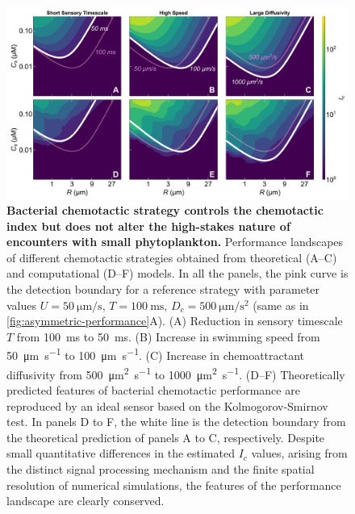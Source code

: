 \documentclass[9pt,twocolumn,twoside]{pnas-new}
\begin{document}
\begin{figure}
    \centering
    \includegraphics[width=17.8cm]{fig4_mod.pdf}
    \caption{
        \textbf{
        Bacterial chemotactic strategy controls the chemotactic index but does not alter the high-stakes nature of encounters with small phytoplankton.
        }
        Performance landscapes of different chemotactic strategies obtained from theoretical (A--C) and computational (D--F) models.
        In all the panels, the pink curve is the detection boundary for a reference strategy with parameter values $U=\SI{50}{\micro\m\per\s}$, $T=\SI{100}{\milli\s}$, $D_c=\SI{500}{\micro\m\per\s^2}$ (same as in \autoref{fig:asymmetric-performance}A).
        (A) Reduction in sensory timescale $T$ from \SI{100}{\milli\s} to \SI{50}{\milli\s}.
        (B) Increase in swimming speed from \SI{50}{\micro\m\per\s} to \SI{100}{\micro\m\per\s}.
        (C) Increase in chemoattractant diffusivity from \SI{500}{\micro\m^2\per\s} to \SI{1000}{\micro\m^2\per\s}.
        (D--F) Theoretically predicted features of bacterial chemotactic performance are reproduced by an ideal sensor based on the Kolmogorov-Smirnov test.
        In panels D to F, the white line is the detection boundary from the theoretical prediction of panels A to C, respectively.
        Despite small quantitative differences in the estimated $I_c$ values, arising from the distinct signal processing mechanism and the finite spatial resolution of numerical simulations,
        the features of the performance landscape are clearly conserved.
    }
    \label{fig:strategies}
\end{figure}
\end{document}
